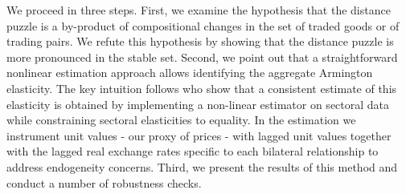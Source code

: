 \documentclass[12pt,twoside,a4paper,notitlepage]{article}
\begin{document}
We proceed in three steps. First, we examine the hypothesis that the distance puzzle is a by-product of compositional changes in the set of traded goods or of trading pairs. We refute this hypothesis by showing that the distance puzzle is more pronounced in the stable set.
Second, we point out that a straightforward nonlinear estimation approach allows identifying the aggregate Armington elasticity. The key intuition follows \cite{Imbs2015} who show that a consistent estimate of this elasticity is obtained by implementing a non-linear estimator on sectoral data while constraining sectoral elasticities to equality. In the estimation we instrument unit values - our proxy of prices - with lagged unit values together with the lagged real exchange rates specific to each bilateral relationship to address endogeneity concerns. 
Third, we present the results of this method and conduct a number of robustness checks. 
\end{document}
